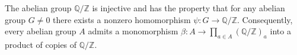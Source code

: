 The abelian group $\mathbb{Q}/\mathbb{Z}$ is injective and has the property that for any abelian group $G \neq 0$ there exists a nonzero homomorphism $\psi : G \rightarrow \mathbb{Q}/\mathbb{Z}$. Consequently, every abelian group $A$ admits a monomorphism $\beta : A \rightarrow \prod_{a \in A} (\mathbb{Q}/\mathbb{Z})_a$ into a product of copies of $\mathbb{Q}/\mathbb{Z}$.
